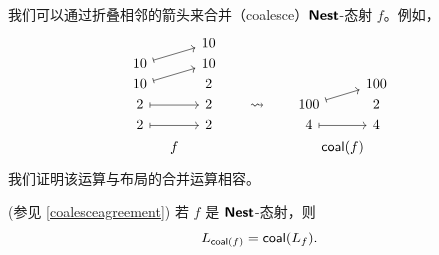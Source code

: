我们可以通过折叠相邻的箭头来合并（coalesce）${\boldsymbol{\mathsf{Nest}}}$-态射 $f$。例如，
\[\begin{tikzcd}[row sep = 1, column sep = 8]
 & & 10 & & & & & & \\
 10 \ar[urr,mapsto] & & 10 & & & & & & \\
 10 \ar[urr,mapsto] & & 2 & & & & & & 100\\
 2 \ar[rr,mapsto] & & 2 & & \rightsquigarrow & & 100 \ar[urr,mapsto] & & 2\\
 2 \ar[rr,mapsto] & & 2 & & & & 4 \ar[rr,mapsto] & & 4\\
    & f & & & & & & \mathclap{\coalesce(f)} & 
\end{tikzcd}\]
我们证明该运算与布局的合并运算相容。
\begin{mainthm}(参见 \ref{coalesceagreement}) 若 $f$ 是 ${\boldsymbol{\mathsf{Nest}}}$-态射，则
\[
L_{\mathsf{coal}(f)} = \mathsf{coal}(L_f).
\]
\end{mainthm}

